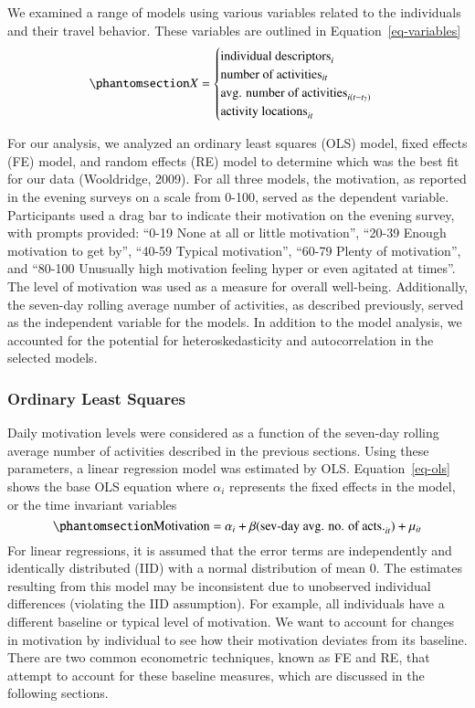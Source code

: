 \documentclass[
  letterpaper,
  number,
  review,
  3p]{elsarticle}
\begin{document}
We examined a range of models using various variables related to the
individuals and their travel behavior. These variables are outlined in
Equation~\ref{eq-variables}
\begin{equation}\phantomsection\label{eq-variables}{
X = 
\begin{cases} 
\text{individual descriptors}_i \\
\text{number of activities}_{it} \\
\text{avg. number of activities}_{i(t-t_7)} \\
\text{activity locations}_{it} \\
\end{cases}
}\end{equation}

For our analysis, we analyzed an ordinary least squares (OLS) model,
fixed effects (FE) model, and random effects (RE) model to determine
which was the best fit for our data (Wooldridge, 2009). For all three
models, the motivation, as reported in the evening surveys on a scale
from 0-100, served as the dependent variable. Participants used a drag
bar to indicate their motivation on the evening survey, with prompts
provided: ``0-19 None at all or little motivation'', ``20-39 Enough
motivation to get by'', ``40-59 Typical motivation'', ``60-79 Plenty of
motivation'', and ``80-100 Unusually high motivation feeling hyper or
even agitated at times''. The level of motivation was used as a measure
for overall well-being. Additionally, the seven-day rolling average
number of activities, as described previously, served as the independent
variable for the models. In addition to the model analysis, we accounted
for the potential for heteroskedasticity and autocorrelation in the
selected models.

\subsubsection{Ordinary Least Squares}\label{ordinary-least-squares}

Daily motivation levels were considered as a function of the seven-day
rolling average number of activities described in the previous sections.
Using these parameters, a linear regression model was estimated by OLS.
Equation~\ref{eq-ols} shows the base OLS equation where \(\alpha_{i}\)
represents the fixed effects in the model, or the time invariant
variables \begin{equation}\phantomsection\label{eq-ols}{
\text{Motivation} = \alpha_{i} + \beta (\text{sev-day avg. no. of acts.}_{it}) + \mu_{it}
}\end{equation} For linear regressions, it is assumed that the error
terms are independently and identically distributed (IID) with a normal
distribution of mean 0. The estimates resulting from this model may be
inconsistent due to unobserved individual differences (violating the IID
assumption). For example, all individuals have a different baseline or
typical level of motivation. We want to account for changes in
motivation by individual to see how their motivation deviates from its
baseline. There are two common econometric techniques, known as FE and
RE, that attempt to account for these baseline measures, which are
discussed in the following sections.
\end{document}
